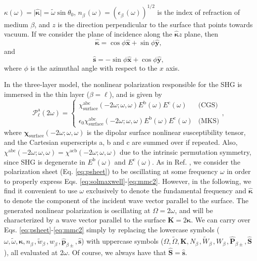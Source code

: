 \documentclass[aps,prb,10pt,showpacs,letterpaper,twocolumn]{revtex4-1}
\begin{document}
$\kappa(\omega)=\vert\hat{\boldsymbol{\kappa}}\vert =
\tilde{\omega}\sin\theta_{0}$, $n^{\phantom{A}}_{\beta}(\omega) =
(\epsilon^{\phantom{A}}_{\beta}(\omega))^{1/2}$ is the index of refraction of
medium $\beta$, and $z$ is the direction perpendicular to the surface that
points towards vacuum. If we consider the plane of incidence along the
$\hat{\boldsymbol{\kappa}}z$ plane, then
\begin{equation}\label{eq:mc1}
\hat{\boldsymbol{\kappa}} = \cos\phi\hat{\mathbf{x}} + \sin\phi\hat{\mathbf{y}},
\end{equation}
and
\begin{equation}\label{eq:mmc2}
\hat{\mathbf{s}} = -\sin\phi\hat{\mathbf{x}} + \cos\phi\hat{\mathbf{y}},
\end{equation}
where $\phi$ is the azimuthal angle with respect to the $x$ axis.

In the three-layer model, the nonlinear polarization responsible for the SHG is
immersed in the thin layer ($\beta=\ell$), and is given by
\begin{equation}\label{eq:tres}
\mathcal{P}^{\mathrm{a}}_\ell(2\omega)=
\left\{
\begin{array}{cc}
\chi^{\mathrm{abc}}_{\mathrm{surface}}(-2\omega;\omega,\omega)
    E^{\mathrm{b}}(\omega)E^{\mathrm{c}}(\omega)
    & \text{(CGS)}\\\\
\epsilon_{0}\chi^{\mathrm{abc}}_{\mathrm{surface}}(-2\omega;\omega,\omega)
    E^{\mathrm{b}}(\omega)E^{\mathrm{c}}(\omega)
    & \text{(MKS)}
\end{array}
\right.,
\end{equation}
where $\boldsymbol{\chi}_{\mathrm{surface}}(-2\omega;\omega,\omega)$ is the
dipolar surface nonlinear susceptibility tensor, and the Cartesian superscripts
a, b and c are summed over if repeated. Also,
$\chi^{\mathrm{abc}}(-2\omega;\omega,\omega) =
\chi^{\mathrm{acb}}(-2\omega;\omega,\omega)$ due to the intrinsic permutation
symmetry, since SHG is degenerate in $E^{\mathrm{b}}(\omega)$ and
$E^{\mathrm{c}}(\omega)$. As in Ref. , we consider the
polarization sheet (Eq. \eqref{eq:psheet}) to be oscillating at some frequency
$\omega$ in order to properly express Eqs.
\eqref{eq:solmaxwell}-\eqref{eq:mmc2}. However, in the following, we find it
convenient to use $\omega$ exclusively to denote the fundamental frequency and
$\hat{\boldsymbol{\kappa}}$ to denote the component of the incident wave vector
parallel to the surface. The generated nonlinear polarization is oscillating at
$\Omega = 2\omega$, and will be characterized by a wave vector parallel to the
surface $\mathbf{K} = 2\boldsymbol{\kappa}$. We can carry over Eqs.
\eqref{eq:psheet}-\eqref{eq:mmc2} simply by replacing the lowercase symbols
($\omega, \tilde{\omega}, \boldsymbol{\kappa}, n^{\phantom{A}}_{\beta},
\tilde{w}^{\phantom{A}}_{\beta}, w^{\phantom{A}}_{\beta},
\hat{\mathbf{p}}^{\phantom{A}}_{\beta\pm}, \hat{\mathbf{s}}$) with uppercase
symbols ($\Omega, \tilde{\Omega}, \mathbf{K}, N^{\phantom{A}}_{\beta},
\tilde{W}^{\phantom{A}}_{\beta}, W^{\phantom{A}}_{\beta},
\hat{\mathbf{P}}_{\beta\pm}, \hat{\mathbf{S}}$), all evaluated at $2\omega$. Of
course, we always have that $\hat{\mathbf{S}}=\hat{\mathbf{s}}$.
\end{document}
